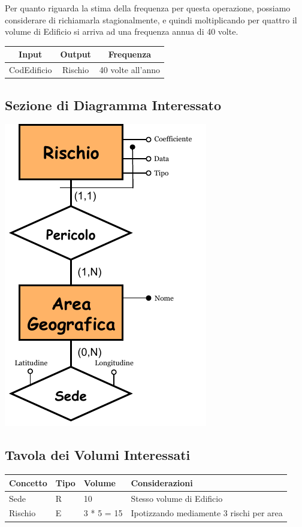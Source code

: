 \documentclass[12pt,a4paper]{report}
\begin{document}
        Per quanto riguarda la stima della frequenza per questa operazione, possiamo considerare di richiamarla stagionalmente, e quindi moltiplicando per quattro il volume di Edificio si arriva ad una frequenza annua di 40 volte.
        
        \begin{center}
            \begin{tabular}{|c|c|c|}
                \hline
                \rowcolor{viola} \textbf{Input} & \textbf{Output} & \textbf{Frequenza} \\ \hline
                CodEdificio & Rischio & 40 volte all'anno \\ \hline
            \end{tabular}
        \end{center}
        
        \subsection{Sezione di Diagramma Interessato}
        \begin{center}
            \includegraphics{sezione_operazione3.pdf}
        \end{center}
        
        \subsection{Tavola dei Volumi Interessati}
        \begin{tabular}{|p{4cm}|p{1cm}|p{3cm}|p{8cm}|}
            \hline
            \textbf{Concetto} & \textbf{Tipo} & \textbf{Volume} & \textbf{Considerazioni} \\ \hline
            Sede & R & 10 & Stesso volume di Edificio \\ \hline
            Rischio & E & 3 * 5 = 15 & Ipotizzando mediamente 3 rischi per area \\ \hline
        \end{tabular}
        
\end{document}
